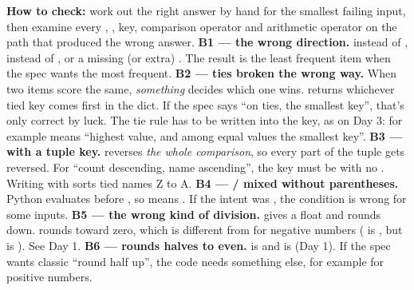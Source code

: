 \documentclass[10pt,a4paper]{article}
\begin{document}
\textbf{How to check:} work out the right answer by hand for the smallest failing input, then examine every , ,  key, comparison operator and arithmetic operator on the path that produced the wrong answer.
\textbf{B1 — the wrong direction.}  instead of , \code{\textgreater{}\allowbreak{}} instead of \code{\textless{}\allowbreak{}}, or a missing (or extra) . The result is the least frequent item when the spec wants the most frequent.
\textbf{B2 — ties broken the wrong way.} When two items score the same, \emph{something} decides which one wins.  returns whichever tied key comes first in the dict. If the spec says “on ties, the smallest key”, that’s only correct by luck. The tie rule has to be written into the key, as on Day 3: for example  means “highest value, and among equal values the smallest key”.
\textbf{B3 —  with a tuple key.}  reverses \emph{the whole comparison}, so every part of the tuple gets reversed. For “count descending, name ascending”, the key must be  with no . Writing  with  sorts tied names Z to A.
\textbf{B4 — / mixed without parentheses.} Python evaluates  before , so  means . If the intent was , the condition is wrong for some inputs.
\textbf{B5 — the wrong kind of division.} \code{/\allowbreak{}} gives a float and \code{/\allowbreak{}/\allowbreak{}} rounds down.  rounds toward zero, which is different from \code{/\allowbreak{}/\allowbreak{}} for negative numbers ( is , but  is ). See Day 1.
\textbf{B6 —  rounds halves to even.}  is  and  is  (Day 1). If the spec wants classic “round half up”, the code needs something else, for example  for positive numbers.
\end{document}
